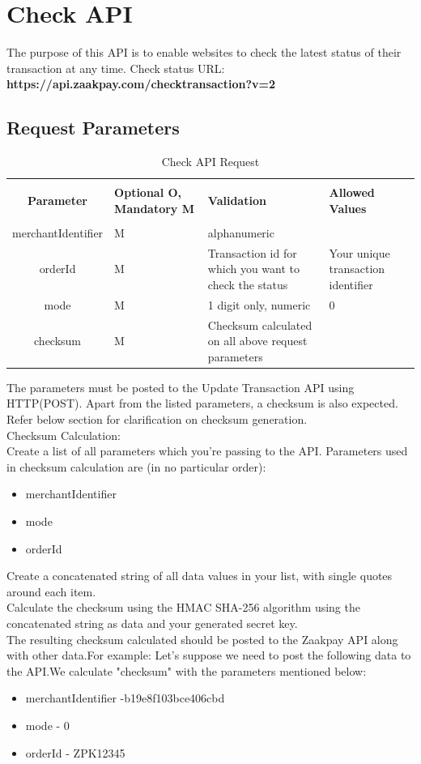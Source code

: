 \documentclass{article}
\begin{document}
\section{Check API}
The purpose of this API is to enable websites to check the latest status of their transaction at any time.
Check status URL: {\bfseries https://api.zaakpay.com/checktransaction?v=2}
\subsection{Request Parameters}
\begin{longtable}{||c| p{2.09cm}| p{5.5cm}| p{4.7cm}||}
\rowcolor{white}
\caption{Check API Request}\\
   \rowcolor{green!50}
\bfseries{Parameter} & \bfseries{Optional O, Mandatory M} & \bfseries{Validation} & \bfseries{Allowed Values} \\ \hline
&&&\\
merchantIdentifier & M & alphanumeric &  \\
orderId & M & Transaction id for which you want to check the status & Your unique transaction identifier\\
mode & M & 1 digit only, numeric & 0\\
checksum & M & Checksum calculated on all above request parameters & \\
\end{longtable}

The parameters must be posted to the Update Transaction API using HTTP(POST). Apart from the listed parameters, a checksum is also expected. Refer below section for clarification on checksum generation.
\\

 Checksum Calculation: \\
Create a list of all parameters which you're passing to the API. Parameters used in checksum calculation are (in no particular order):\\
\begin{itemize}
\item merchantIdentifier
\item mode
\item orderId
\end{itemize}

Create a concatenated string of all data values in your list, with single quotes around each item. \\
Calculate the checksum using the HMAC SHA-256 algorithm using the concatenated string as data and your generated secret key.\\
The resulting checksum calculated should be posted to the Zaakpay API along with other data.For example: Let's suppose we need to post the following data to the API.We calculate "checksum" with the parameters mentioned below:\\
\begin{itemize}
\item merchantIdentifier -b19e8f103bce406cbd
\item mode - 0
\item orderId - ZPK12345
\end{itemize}
\end{document}
